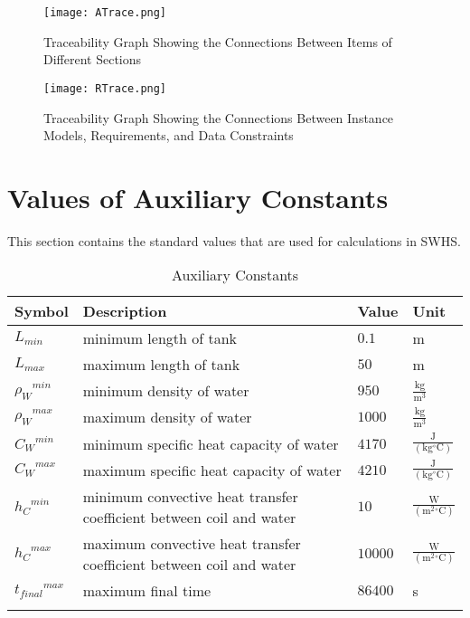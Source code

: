 \documentclass[12pt]{article}
\begin{document}
\begin{figure}
\begin{center}
\texttt{[image: ATrace.png]}
\caption{Traceability Graph Showing the Connections Between Items of Different Sections}
\label{Figure:TraceyA}
\end{center}
\end{figure}
\begin{figure}
\begin{center}
\texttt{[image: RTrace.png]}
\caption{Traceability Graph Showing the Connections Between Instance Models, Requirements, and Data Constraints}
\label{Figure:TraceyR}
\end{center}
\end{figure}
\section{Values of Auxiliary Constants}
\label{Sec:AuxConstants}
This section contains the standard values that are used for calculations in SWHS.
\begin{longtabu}{l X[l] l l}
\toprule
Symbol & Description & Value & Unit
\\
\midrule
${L_{min}}$ & minimum length of tank & $0.1$ & m
\\
${L_{max}}$ & maximum length of tank & $50$ & m
\\
${{ρ_{W}}^{min}}$ & minimum density of water & $950$ & $\frac{\text{kg}}{\text{m}^{3}}$
\\
${{ρ_{W}}^{max}}$ & maximum density of water & $1000$ & $\frac{\text{kg}}{\text{m}^{3}}$
\\
${{C_{W}}^{min}}$ & minimum specific heat capacity of water & $4170$ & $\frac{\text{J}}{(\text{kg}{}^{\circ}\text{C})}$
\\
${{C_{W}}^{max}}$ & maximum specific heat capacity of water & $4210$ & $\frac{\text{J}}{(\text{kg}{}^{\circ}\text{C})}$
\\
${{h_{C}}^{min}}$ & minimum convective heat transfer coefficient between coil and water & $10$ & $\frac{\text{W}}{(\text{m}^{2}{}^{\circ}\text{C})}$
\\
${{h_{C}}^{max}}$ & maximum convective heat transfer coefficient between coil and water & $10000$ & $\frac{\text{W}}{(\text{m}^{2}{}^{\circ}\text{C})}$
\\
${{t_{final}}^{max}}$ & maximum final time & $86400$ & s
\\
\bottomrule
\caption{Auxiliary Constants}
\label{Table:TAuxConsts}
\end{longtabu}
\end{document}
